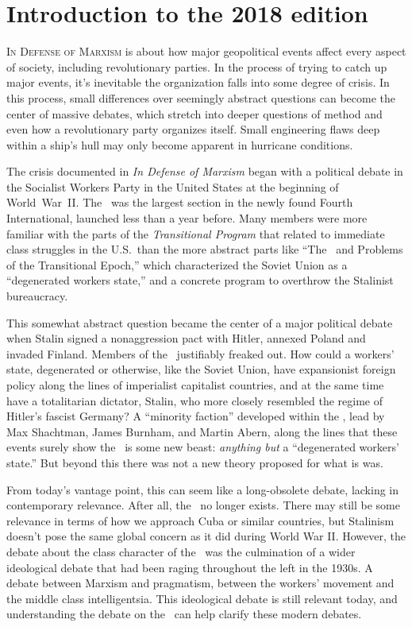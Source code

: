 \chapter{Introduction to the 2018 edition}

\lettrine{I}{n Defense of Marxism} is about how major geopolitical events affect every aspect of society, including revolutionary parties. In the process of trying to catch up major events, it’s inevitable the organization falls into some degree of crisis. In this process, small differences over seemingly abstract questions can become the center of massive debates, which stretch into deeper questions of method and even how a revolutionary party organizes itself. Small engineering flaws deep within a ship’s hull may only become apparent in hurricane conditions.

The crisis documented in \emph{In Defense of Marxism} began with a political debate in the Socialist Workers Party in the United States at the beginning of World~War~II. The \SWP\ was the largest section in the newly found Fourth International, launched less than a year before. Many members were more familiar with the parts of the \emph{Transitional Program} that related to immediate class struggles in the U.S.\ than the more abstract parts like ``The \USSR\ and Problems of the Transitional Epoch,'' which characterized the Soviet Union as a “degenerated workers state,” and a concrete program to overthrow the Stalinist bureaucracy.

This somewhat abstract question became the center of a major political debate when Stalin signed a nonaggression pact with Hitler, annexed Poland and invaded Finland. Members of the \SWP\ justifiably freaked out. How could a workers’ state, degenerated or otherwise, like the Soviet Union, have expansionist foreign policy along the lines of imperialist capitalist countries, and at the same time have a totalitarian dictator, Stalin, who more closely resembled the regime of Hitler’s fascist Germany? A “minority faction” developed within the \SWP, lead by Max Shachtman, James Burnham, and Martin Abern, along the lines that these events surely show the \USSR\ is some new beast: \emph{anything but} a “degenerated workers’ state.” But beyond this there was not a new theory proposed for what is was.

From today’s vantage point, this can seem like a long-obsolete debate, lacking in contemporary relevance. After all, the \USSR\ no longer exists. There may still be some relevance in terms of how we approach Cuba or similar countries, but Stalinism doesn’t pose the same global concern as it did during World War II. However, the debate about the class character of the \USSR\ was the culmination of a wider ideological debate that had been raging throughout the left in the 1930s. A debate between Marxism and pragmatism, between the workers’ movement and the middle class intelligentsia. This ideological debate is still relevant today, and understanding the debate on the \USSR\ can help clarify these modern debates.

